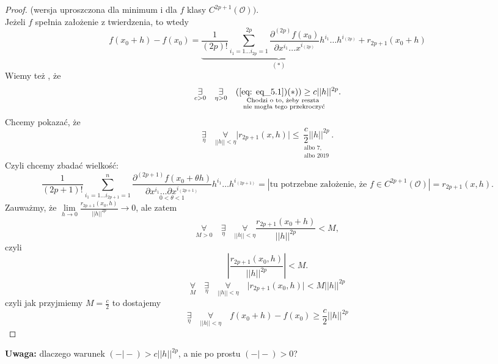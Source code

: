\documentclass[../main.tex]{subfiles}
\begin{document}
\begin{proof}
(wersja uproszczona dla minimum i dla $f$ klasy $C^{2p+1}(\mathcal{O}))$.\\
Jeżeli $f$ spełnia założenie z twierdzenia, to wtedy
\begin{equation}
    \label{eq: eq_5.1}
    f(x_0+h)-f(x_0) = \underbrace{\frac{1}{(2p)!} \sum_{i_1 = 1\ldots i_{2p} = 1}^{2p} \frac{\partial^{(2p)} f(x_0)}{\partial x^{i_1} \dots x^{i_{(2p)}}} h^{i_1} \dots h^{i_{(2p)}}}_{(*)} + r_{2p + 1} (x_0 + h)
\end{equation}
Wiemy też , że
    \[
        \underset{c > 0}{\exists}\quad \underset{\eta > 0}{\exists} \underset{\substack{\text{Chodzi o to, żeby reszta}\\ \text{ nie mogła tego przekroczyć}}}{\quad(\ref{eq: eq_5.1})(*)) \geq c ||h||^{2p}}
    .\]
Chcemy pokazać, że
    \[
        \underset{\eta}{\exists} \quad \underset{||h||<\eta}{\forall} \Big | r_{2p+1} (x,h) \Big | \leq \underset{\substack{\text{albo 7,}\\ \text{albo 2019}}}{\frac{c}{2} ||h||^{2p}}
    .\]
Czyli chcemy zbadać wielkość:
    \[
        \frac{1}{(2p+1)!} \sum_{i_1 = 1 \ldots i_{2p+1} = 1}^n \underset{0 < \theta < 1}{\frac{\partial^{(2p+1)} f (x_0 + \theta h)}{\partial x^{i_1} \dots \partial x^{i_{(2p+1)}}}} h^{i_1} \dots h^{i_{(2p+1)}} = \left| \text{tu potrzebne założenie, że } f \in C^{2p+1} (\mathcal{O})\right| = r_{2p+1} (x,h)
    .\]
Zauważmy, że $\lim\limits_{h \to 0} \frac{r_{2p+1}(x_0, h)}{||h||^{2p}} \to 0$, ale zatem
    \[
        \underset{M>0}{\forall}\quad \underset{\eta}{\exists}\quad \underset{||h|| < \eta}{\forall} \frac{r_{2p+1}(x_0+h)}{||h||^{2p}} < M
    ,\]
czyli
\[
    \left| \frac{r_{2p+1} (x_0,h)}{||h||^{2p}} \right| < M.
\]
    \[
        \underset{M}{\forall}\quad \underset{\eta}{\exists}\quad \underset{||h|| < \eta}{\forall}\quad \Big | r_{2p+1} (x_0,h) \Big | < M \big | \big |h \big | \big |^{2p}
    \]
czyli jak przyjmiemy $M = \frac{c}{2}$ to dostajemy
    \[
        \underset{\eta}{\exists}\quad \underset{||h||<\eta}{\forall}\quad f(x_0+h)-f(x_0) \geq \frac{c}{2} ||h||^{2p}
    \]
\end{proof}

\textbf{Uwaga:} dlaczego warunek $( - \big| - ) > c ||h||^{2p}$, a nie po prostu $( - \big| - ) > 0$?
\end{document}
